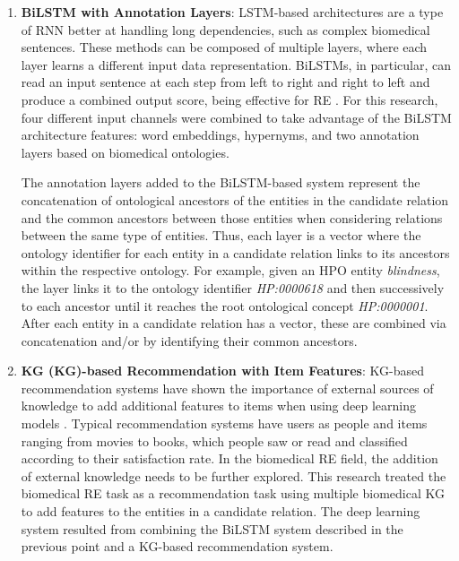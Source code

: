 \begin{enumerate}
    \item \textbf{BiLSTM with Annotation Layers}: \ac{LSTM}-based architectures are a type of \ac{RNN} better at handling long dependencies, such as complex biomedical sentences. These methods can be composed of multiple layers, where each layer learns a different input data representation. BiLSTMs, in particular, can read an input sentence at each step from left to right and right to left and produce a combined output score, being effective for RE \citep{xu2018leveraging,lamurias2019bo}. For this research, four different input channels were combined to take advantage of the BiLSTM architecture features: word embeddings, hypernyms, and two annotation layers based on biomedical ontologies.
    
    The annotation layers added to the BiLSTM-based system represent the concatenation of ontological ancestors of the entities in the candidate relation and the common ancestors between those entities when considering relations between the same type of entities. Thus, each layer is a vector where the ontology identifier for each entity in a candidate relation links to its ancestors within the respective ontology. For example, given an \ac{HPO} entity \textit{blindness}, the layer links it to the ontology identifier \textit{HP:0000618} and then successively to each ancestor until it reaches the root ontological concept \textit{HP:0000001}. After each entity in a candidate relation has a vector, these are combined via concatenation and/or by identifying their common ancestors. 
    
    \item \textbf{\acl{KG} (KG)-based Recommendation with Item Features}: KG-based recommendation systems have shown the importance of external sources of knowledge to add additional features to items when using deep learning models \citep{10.1145/2827872,barros2019using,9216015}. Typical recommendation systems have users as people and items ranging from movies to books, which people saw or read and classified according to their satisfaction rate. In the biomedical RE field, the addition of external knowledge needs to be further explored. This research treated the biomedical RE task as a recommendation task using multiple biomedical \ac{KG} to add features to the entities in a candidate relation. The deep learning system resulted from combining the BiLSTM system described in the previous point and a \ac{KG}-based recommendation system. 
    

\end{enumerate}
